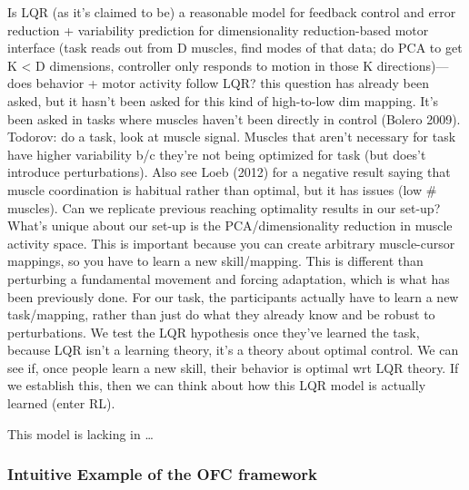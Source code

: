 {            Is LQR (as it's claimed to be) a reasonable model for
            feedback control and error reduction + variability
            prediction for dimensionality reduction-based motor
            interface (task reads out from D muscles, find modes of that
            data; do PCA to get K \textless{} D dimensions, controller
            only responds to motion in those K directions)---does
            behavior + motor activity follow LQR? this question has
            already been asked, but it hasn't been asked for this kind
            of high-to-low dim mapping. It's been asked in tasks where
            muscles haven't been directly in control (Bolero 2009).
            Todorov: do a task, look at muscle signal. Muscles that
            aren't necessary for task have higher variability b/c
            they're not being optimized for task (but does't introduce
            perturbations). Also see Loeb (2012) for a negative result
            saying that muscle coordination is habitual rather than
            optimal, but it has issues (low \# muscles). Can we
            replicate previous reaching optimality results in our
            set-up? What's unique about our set-up is the
            PCA/dimensionality reduction in muscle activity space. This
            is important because you can create arbitrary muscle-cursor
            mappings, so you have to learn a new skill/mapping. This is
            different than perturbing a fundamental movement and forcing
            adaptation, which is what has been previously done. For our
            task, the participants actually have to learn a new
            task/mapping, rather than just do what they already know and
            be robust to perturbations. We test the LQR hypothesis once
            they've learned the task, because LQR isn't a learning
            theory, it's a theory about optimal control. We can see if,
            once people learn a new skill, their behavior is optimal wrt
            LQR theory. If we establish this, then we can think about
            how this LQR model is actually learned (enter RL).

            This model is lacking in \ldots{}

            \hypertarget{intuitive-example-of-the-ofc-framework}{%
            \subsubsection{Intuitive Example of the OFC
            framework}\label{intuitive-example-of-the-ofc-framework}}

}

